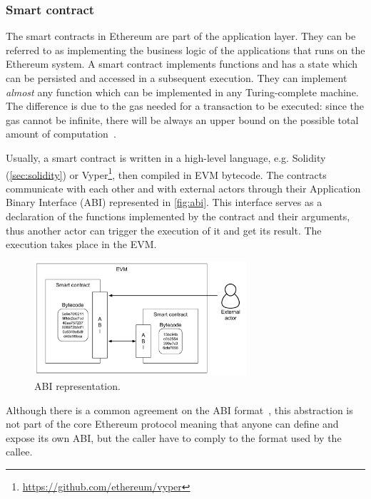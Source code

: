 \subsubsection{Smart contract}
\label{sec:smart-contract}

The smart contracts in Ethereum are part of the application layer. They can be
referred to as implementing the business logic of the applications that runs on
the Ethereum system. A smart contract implements functions and has a state which
can be persisted and accessed in a subsequent execution. They can implement
\emph{almost} any function which can be implemented in any Turing-complete
machine. The difference is due to the gas needed for a transaction to be
executed: since the gas cannot be infinite, there will be always an upper bound
on the possible total amount of computation~\cite{wood2018ethereum}.

Usually, a smart contract is written in a high-level language, e.g. Solidity
(\autoref{sec:solidity}) or
Vyper\footnote{\url{https://github.com/ethereum/vyper}}, then compiled in EVM
bytecode. The contracts communicate with each other and with external actors
through their Application Binary Interface (ABI) represented in
\autoref{fig:abi}. This interface serves as a declaration of the functions
implemented by the contract and their arguments, thus another actor can trigger
the execution of it and get its result. The execution takes place in the EVM.

\begin{figure}
	\begin{center}
		\includegraphics[width=0.7\textwidth]{./res/img/abi.pdf}
	\end{center}
	\caption{ABI representation.}
	\label{fig:abi}
\end{figure}

Although there is a common agreement on the ABI format~\cite{bib:solidity-docs},
this abstraction is not part of the core Ethereum protocol meaning that anyone
can define and expose its own ABI, but the caller have to comply to the format
used by the callee.
